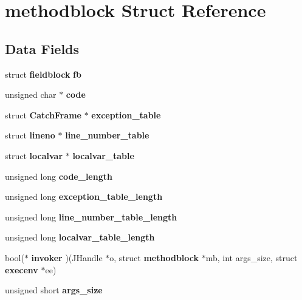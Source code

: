 \section{methodblock Struct Reference}
\label{structmethodblock}
\subsection*{Data Fields}
\begin{DoxyCompactItemize}
\item 
struct {\bf fieldblock} {\bfseries fb}\label{structmethodblock_a22cbb6a76155a830e8b739e5fb1a1d11}

\item 
unsigned char $\ast$ {\bfseries code}\label{structmethodblock_a4367fe216f8bb73fa4261ccd25f6235d}

\item 
struct {\bf CatchFrame} $\ast$ {\bfseries exception\_\-table}\label{structmethodblock_a3e75972c8bd9087874795f4aea647d08}

\item 
struct {\bf lineno} $\ast$ {\bfseries line\_\-number\_\-table}\label{structmethodblock_af75b5956d4f66d22cf1656db929d5b14}

\item 
struct {\bf localvar} $\ast$ {\bfseries localvar\_\-table}\label{structmethodblock_ac1a1dcb57af212d0f318a1e104541bc6}

\item 
unsigned long {\bfseries code\_\-length}\label{structmethodblock_a6e6a8a50fbc1982d2fd9fe93d459c9ee}

\item 
unsigned long {\bfseries exception\_\-table\_\-length}\label{structmethodblock_ae47d3e28a0b0fe23449d0f5057b7e051}

\item 
unsigned long {\bfseries line\_\-number\_\-table\_\-length}\label{structmethodblock_a57cb612b7f739c1be17ead85a705a6ae}

\item 
unsigned long {\bfseries localvar\_\-table\_\-length}\label{structmethodblock_a2e60a3d2add45a5ee5d9a4067cad6ca8}

\item 
bool($\ast$ {\bfseries invoker} )(JHandle $\ast$o, struct {\bf methodblock} $\ast$mb, int args\_\-size, struct {\bf execenv} $\ast$ee)\label{structmethodblock_ac4f534e544985c01ac6d569a8f0679f9}

\item 
unsigned short {\bfseries args\_\-size}\label{structmethodblock_a0a209dae5b35ef9ce2bd763b13ef1a88}


\end{DoxyCompactItemize}
